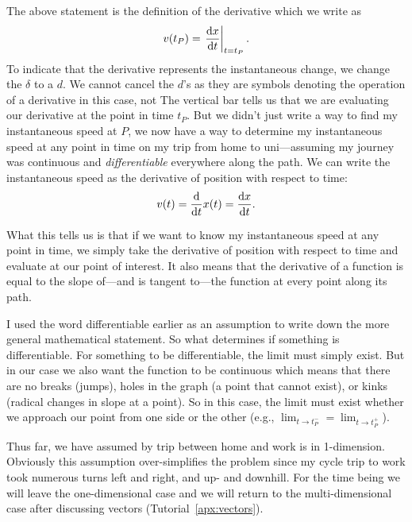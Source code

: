 The above statement is the definition of the derivative which we write as
\begin{equation*}
    v(t_P) = \left. \dv{x}{t} \right|_{t = t_P} .
\end{equation*}
To indicate that the derivative represents the instantaneous change, we change
the $\delta$ to a $d$.  We cannot cancel the $d$'s as they are symbols denoting
the operation of a derivative in this case, not The vertical bar tells us that
we are evaluating our derivative at the point in time $t_P$.  But we didn't just
write a way to find my instantaneous speed at $P$, we now have a way to
determine my instantaneous speed at any point in time on my trip from home to
uni---assuming my journey was continuous and {\it differentiable} everywhere
along the path.  We can write the instantaneous speed as the derivative of
position with respect to time:
\begin{equation*}
    v(t) = \dv{}{t} x(t) = \dv{x}{t}.
\end{equation*}

What this tells us is that if we want to know my instantaneous speed at any
point in time, we simply take the derivative of position with respect to time
and evaluate at our point of interest.  It also means that the derivative of a
function is equal to the slope of---and is tangent to---the function at every
point along its path.

I used the word differentiable earlier as an assumption to write down the
more general mathematical statement.  So what determines if something is
differentiable.  For something to be differentiable, the limit must simply
exist.  But in our case we also want the function to be continuous which means
that there are no breaks (jumps), holes in the graph (a point that cannot
exist), or kinks (radical changes in slope at a point).  So in this case, the
limit must exist whether we approach our point from one side or the other (e.g.,
$\lim_{t \to t_P^-} = \lim_{t \to t_P^+}$).

Thus far, we have assumed by trip between home and work is in 1-dimension.
Obviously this assumption over-simplifies the problem since my cycle trip to
work took numerous turns left and right, and up- and downhill.  For the time
being we will leave the one-dimensional case and we will return to the
multi-dimensional case after discussing vectors (Tutorial~\ref{apx:vectors}).


